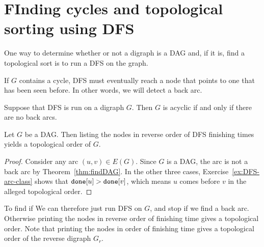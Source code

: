 \section{FInding cycles and topological sorting using DFS}

One way to determine whether or not a digraph is a DAG and, if it is, find a topological sort is to run a DFS on the graph.

 If $G$ contains a cycle,  DFS must eventually reach
a node that points to one that has been seen before. In other words, we
will detect a back arc. 

\begin{Theorem}
\label{thm:findDAG}
Suppose that DFS is run on a digraph $G$. Then $G$ is acyclic if and
only if there are no back arcs.
\end{Theorem}

%
%

\begin{Theorem}
Let $G$ be a DAG. Then listing the nodes in reverse order of DFS
finishing times yields a topological order of $G$.
\end{Theorem}

\begin{proof} 
Consider any arc $(u,v)\in E(G)$. Since $G$ is a DAG,
the arc is not a back arc by Theorem~\ref{thm:findDAG}. In the other three
cases, Exercise~\ref{ex:DFS-arc-class} shows that $\done[u] > \done[v]$,
which means $u$ comes before $v$ in the alleged topological order.
\end{proof}

To find if 
We can therefore just run DFS on $G$, and stop if we find a back
arc. Otherwise printing the nodes in reverse order of finishing time
gives a topological order. Note that printing the nodes in order of
finishing time gives a topological order of the reverse digraph $G_r$.

